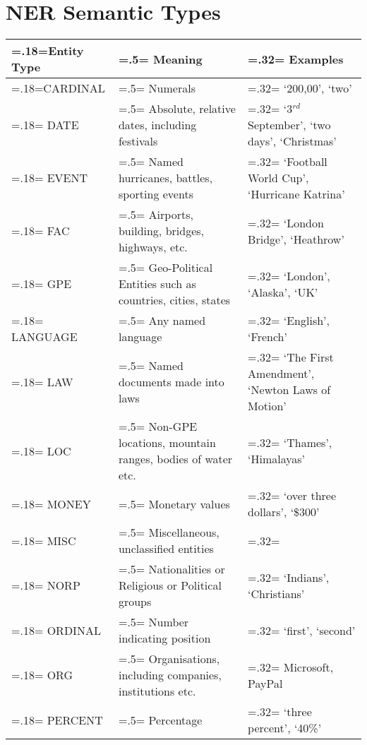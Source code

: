 \chapter{\vspace{-3px}NER Semantic Types}

\vspace{-3em}
\begin{table}[H]
    \centering
    \renewcommand{\arraystretch}{1.1}
    \begin{tabularx}{\textwidth}{|>{\hsize=.18\hsize\linewidth=\hsize}X|>{\hsize=.5\hsize\linewidth=\hsize}X|>{\hsize=.32\hsize\linewidth=\hsize}X|} 
     \hline
      \textbf{Entity Type} & \textbf{Meaning} & \textbf{Examples}\\
     \hline
        CARDINAL & Numerals  & `200,00', `two'\\
        \hline
        DATE &  Absolute, relative dates, including festivals & `3$^{rd}$ September', `two days', `Christmas'\\
        \hline
        EVENT &  Named hurricanes, battles, sporting events & `Football World Cup', `Hurricane Katrina'
        \\
        \hline
        FAC &  Airports, building, bridges, highways, etc. & `London Bridge', `Heathrow'\\
        \hline
        GPE &  Geo-Political Entities such as countries, cities, states & `London', `Alaska', `UK'\\
        \hline
        LANGUAGE & Any named language & `English', `French' \\
        \hline
        LAW & Named documents made into laws & `The First Amendment', `Newton Laws of Motion'\\
        \hline
        LOC & Non-GPE locations, mountain ranges, bodies of water etc. & `Thames', `Himalayas' \\
        \hline
        MONEY & Monetary values & `over three dollars', `\$300'\\
        \hline
        MISC & Miscellaneous, unclassified entities & \\
        \hline
        NORP & Nationalities or Religious or Political groups & `Indians', `Christians'\\
        \hline
        ORDINAL & Number indicating position & `first', `second' \\
        \hline
        ORG &  Organisations, including companies, institutions etc. & Microsoft, PayPal \\
        \hline
        PERCENT & Percentage & `three percent', `40\%'\\

\end{tabularx}
\end{table}
